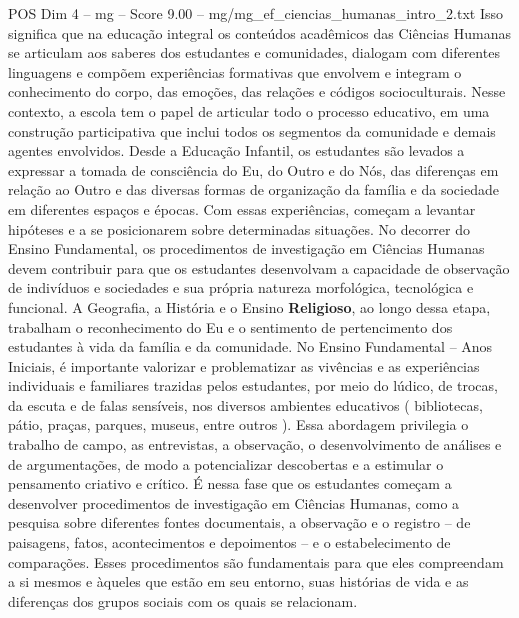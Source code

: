 \begin{textsample}{POS Dim 4 – mg – Score 9.00 – mg/mg\_ef\_ciencias\_humanas\_intro\_2.txt}
Isso significa que na educação integral os conteúdos acadêmicos das Ciências Humanas se articulam aos saberes dos estudantes e comunidades, dialogam com diferentes linguagens e compõem experiências formativas que envolvem e integram o conhecimento do corpo, das emoções, das relações e códigos socioculturais.
Nesse contexto, a escola tem o papel de articular todo o processo educativo, em uma construção participativa que inclui todos os segmentos da comunidade e demais agentes envolvidos.
Desde a Educação Infantil, os estudantes são levados a expressar a tomada de consciência do Eu, do Outro e do Nós, das diferenças em relação ao Outro e das diversas formas de organização da família e da sociedade em diferentes espaços e épocas.
Com essas experiências, começam a levantar hipóteses e a se posicionarem sobre determinadas situações.
No decorrer do Ensino Fundamental, os procedimentos de investigação em Ciências Humanas devem contribuir para que os estudantes desenvolvam a capacidade de observação de indivíduos e sociedades e sua própria natureza morfológica, tecnológica e funcional.
A Geografia, a História e o Ensino \textbf{Religioso}, ao longo dessa etapa, trabalham o reconhecimento do Eu e o sentimento de pertencimento dos estudantes à vida da família e da comunidade.
No Ensino Fundamental – Anos Iniciais, é importante valorizar e problematizar as vivências e as experiências individuais e familiares trazidas pelos estudantes, por meio do lúdico, de trocas, da escuta e de falas sensíveis, nos diversos ambientes educativos ( bibliotecas, pátio, praças, parques, museus, entre outros ).
Essa abordagem privilegia o trabalho de campo, as entrevistas, a observação, o desenvolvimento de análises e de argumentações, de modo a potencializar descobertas e a estimular o pensamento criativo e crítico.
É nessa fase que os estudantes começam a desenvolver procedimentos de investigação em Ciências Humanas, como a pesquisa sobre diferentes fontes documentais, a observação e o registro – de paisagens, fatos, acontecimentos e depoimentos – e o estabelecimento de comparações.
Esses procedimentos são fundamentais para que eles compreendam a si mesmos e àqueles que estão em seu entorno, suas histórias de vida e as diferenças dos grupos sociais com os quais se relacionam.

\end{textsample}
